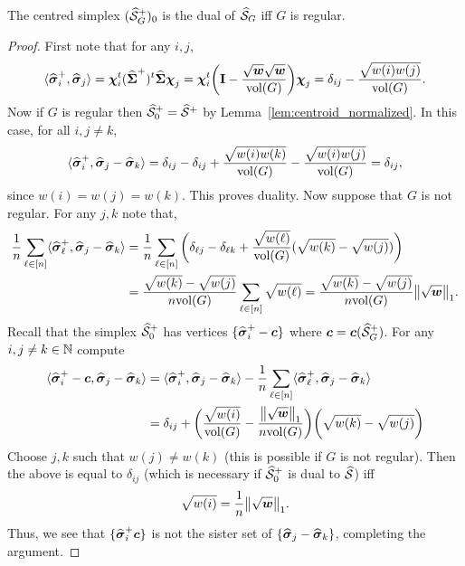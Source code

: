 \begin{lemma}
	\label{lem:inverse_not_dual}
	The centred simplex $(\widehat{\mathcal{S}}_G^+)_0$ is the dual of $\widehat{\mathcal{S}}_G$ iff $G$ is regular. 
\end{lemma}
\begin{proof}
	First note that for  any $i,j$,  
	\begin{equation*}
	\langle \widehat{\vb*{\sigma}}_i^+,\widehat{\vb*{\sigma}}_j\rangle = \boldsymbol{\chi}_i^t(\widehat{\boldsymbol{\Sigma}}^+)^t\widehat{\boldsymbol{\Sigma}}\boldsymbol{\chi}_j = \boldsymbol{\chi}_i^t\bigg(\vb{I}-\frac{\sqrt{\vb*{w}}\sqrt{\vb*{w}}}{\textnormal{vol}(G)}\bigg)\boldsymbol{\chi}_j = \delta_{ij} - \frac{\sqrt{w(i)w(j)}}{\textnormal{vol}(G)}.
	\end{equation*}
	Now if $G$ is regular then $\widehat{\mathcal{S}}^+_0=\widehat{\mathcal{S}}^+$ by Lemma~\ref{lem:centroid_normalized}. In  this case, for all $i,j\neq k$, 
	\begin{equation*}
	\langle \widehat{\vb*{\sigma}}_i^+,\widehat{\vb*{\sigma}}_j-\widehat{\vb*{\sigma}}_k\rangle = \delta_{ij} - \delta_{ij} + \frac{\sqrt{w(i)w(k)}}{\textnormal{vol}(G)} - \frac{\sqrt{w(i)w(j)}}{\textnormal{vol}(G)} = \delta_{ij},
	\end{equation*}
	since $w(i)=w(j)=w(k)$. This proves duality. Now suppose that $G$ is not  regular.
	For  any $j,k$ note  that,
	\begin{align*}
	\frac{1}{n}\sum_{\ell\in[n]}\langle \widehat{\vb*{\sigma}}_\ell^+,\widehat{\vb*{\sigma}}_j-\widehat{\vb*{\sigma}}_k\rangle &= \frac{1}{n}\sum_{\ell\in[n]} \bigg(\delta_{\ell j}-\delta_{\ell k} + \frac{\sqrt{w(\ell)}}{\textnormal{vol}(G)}(\sqrt{w(k)}-\sqrt{w(j)})\bigg) \\ 
	&= \frac{\sqrt{w(k)}-\sqrt{w(j)}}{n\textnormal{vol}(G)}\sum_{\ell\in[n]}\sqrt{w(\ell)} = \frac{\sqrt{w(k)}-\sqrt{w(j)}}{n\textnormal{vol}(G)}\norm{\sqrt{\vb*{w}}}_1.
	\end{align*}
	Recall that the simplex $\widehat{\mathcal{S}}^+_0$ has vertices $\{\widehat{\vb*{\sigma}}_i^+-\vb*{c}\}$ where $\vb*{c}=\vb*{c}(\widehat{\mathcal{S}}_G^+)$. 
	For any $i,j\neq  k\in\mathbb{N}$ compute
	\begin{align*}
	\langle \widehat{\vb*{\sigma}}_i^+-\vb*{c},\widehat{\vb*{\sigma}}_j-\widehat{\vb*{\sigma}}_k\rangle &= \langle \widehat{\vb*{\sigma}}_i^+,\widehat{\vb*{\sigma}}_j-\widehat{\vb*{\sigma}}_k\rangle - \frac{1}{n}\sum_{\ell\in[n]}\langle \widehat{\vb*{\sigma}}_\ell^+,\widehat{\vb*{\sigma}}_j-\widehat{\vb*{\sigma}}_k\rangle \\
	&= \delta_{ij} + \bigg(\frac{\sqrt{w(i)}}{\textnormal{vol}(G)}-\frac{\norm{\sqrt{\vb*{w}}}_1}{n\textnormal{vol}(G)}\bigg)\bigg(\sqrt{w(k)} - \sqrt{w(j)}\bigg)
	\end{align*}
	Choose $j,k$ such that $w(j)\neq w(k)$ (this is  possible if $G$  is  not  regular). Then the above is equal to  $\delta_{ij}$ (which  is necessary if $\widehat{\mathcal{S}}^+_0$ is dual to $\widehat{\mathcal{S}}$) iff 
	\begin{equation*}
	\label{eq:lem_inverse_not_dual}
	\sqrt{w(i)} = \frac{1}{n}\norm{\sqrt{\vb*{w}}}_1.
	\end{equation*}
	Thus, we see  that $\{\widehat{\vb*{\sigma}}_i^+\vb*{c}\}$ is not the sister set of $\{\widehat{\vb*{\sigma}}_j-\widehat{\vb*{\sigma}}_k\}$, completing the argument. 
\end{proof}

